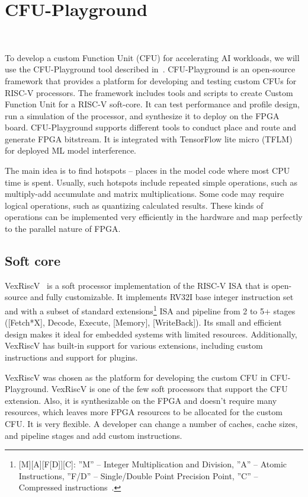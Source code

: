 \section{CFU-Playground}\

To develop a custom Function Unit (CFU) for accelerating AI workloads, we will use the CFU-Playground tool described in~\cite{cfu_playground}. CFU-Playground is an open-source framework that provides a platform for developing and testing custom CFUs for RISC-V processors. The framework includes tools and scripts to create Custom Function Unit for a RISC-V soft-core. It can test performance and profile design, run a simulation of the processor, and synthesize it to deploy on the FPGA board. CFU-Playground supports different tools to conduct place and route and generate FPGA bitstream. It is integrated with TensorFlow lite micro (TFLM) for deployed ML model interference. 

The main idea is to find hotspots -- places in the model code where most CPU time is spent. Usually, such hotspots include repeated simple operations, such as multiply-add accumulate and matrix multiplications. Some code may require logical operations, such as quantizing calculated results. These kinds of operations can be implemented very efficiently in the hardware and map perfectly to the parallel nature of FPGA. 

\subsection{Soft core}

VexRiscV~\cite{vexriscv} is a soft processor implementation of the RISC-V ISA that is open-source and fully customizable. It implements RV32I base integer instruction set and with a subset of standard extensions\footnote{[M][A][F[D]][C]: ''M'' -- Integer Multiplication and Division, ''A'' -- Atomic Instructions, ''F/D'' -- Single/Double Point Precision Point, ''C'' -- Compressed instructions~\cite{risc_v_manual}.} ISA and pipeline from 2 to 5+ stages ([Fetch*X], Decode, Execute, [Memory], [WriteBack]). Its small and efficient design makes it ideal for embedded systems with limited resources. Additionally, VexRiscV has built-in support for various extensions, including custom instructions and support for plugins. 

VexRiscV was chosen as the platform for developing the custom CFU in CFU-Playground. VexRiscV is one of the few soft processors that support the CFU extension. Also, it is synthesizable on the FPGA and doesn't require many resources, which leaves more FPGA resources to be allocated for the custom CFU. It is very flexible. A developer can change a number of caches, cache sizes, and pipeline stages and add custom instructions. 

